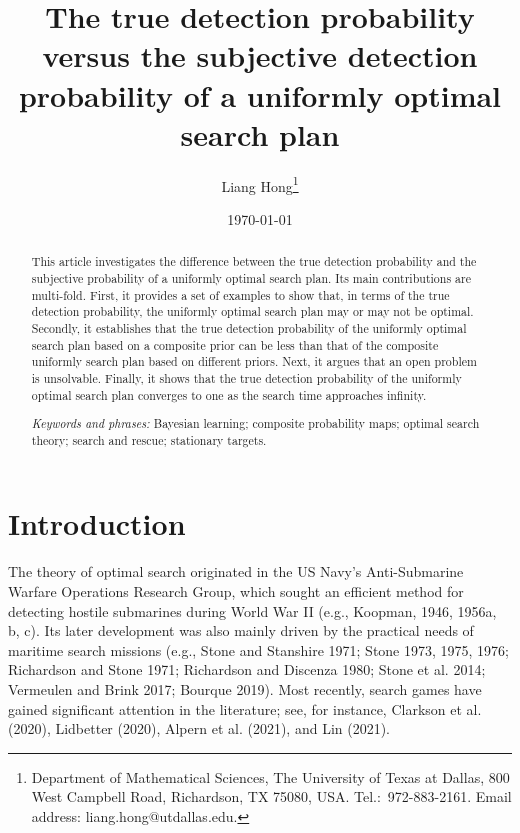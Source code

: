 \documentclass[12pt]{article}
\title{The true detection probability versus the subjective detection probability of a uniformly  optimal search plan}
\author{Liang Hong\footnote{Department of Mathematical Sciences,  The University of Texas at Dallas, 800 West Campbell Road, Richardson, TX 75080, USA. Tel.:~972-883-2161. Email address: liang.hong@utdallas.edu.}}
\date{\today}
\theoremstyle{plain}
\theoremstyle{definition}
\theoremstyle{remark}
\begin{document}
\maketitle



\begin{abstract}

This article investigates the difference between the true detection probability and the subjective probability of a uniformly optimal search plan.  Its main contributions are multi-fold.  First, it provides a set of examples to show that, in terms of the true detection probability, the uniformly optimal search plan may or may not be optimal.  Secondly,  it establishes that the true detection probability of the uniformly optimal search plan based on a composite prior can be less than that of the composite uniformly search plan based on different priors.  Next,  it argues that an open problem is unsolvable.  Finally, it shows that the true detection probability of the uniformly optimal search plan converges to one as the search time approaches infinity.




\smallskip

\emph{Keywords and phrases:} Bayesian learning; composite probability maps; optimal search theory; search and rescue; stationary targets.

\end{abstract}


%
\section{Introduction}

The theory of optimal search originated in the US Navy's Anti-Submarine Warfare Operations Research Group, which sought an efficient method for detecting hostile submarines during World War II (e.g., Koopman, 1946, 1956a, b, c).  Its later development was also mainly driven by the practical needs of maritime search missions (e.g., Stone and Stanshire 1971; Stone 1973, 1975, 1976; Richardson and Stone 1971; Richardson and Discenza 1980; Stone et al.  2014; Vermeulen and Brink 2017; Bourque 2019).  Most recently,  search games have gained significant attention in the literature; see, for instance,  Clarkson et al. (2020),  Lidbetter (2020),  Alpern et al. (2021),  and Lin (2021). 
\end{document}
